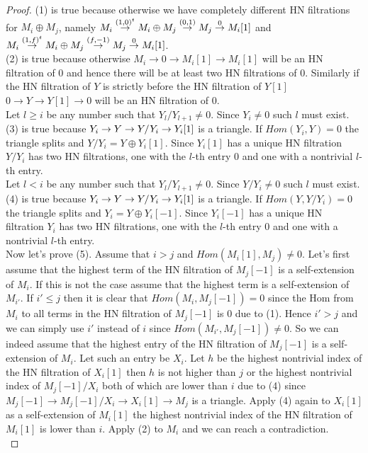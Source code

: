 \begin{proof}
\indent (1) is true because otherwise we have completely different HN filtrations for $M_i\oplus M_j$, namely $M_i\overset{(1,0)^t}{\to} M_i\oplus M_j\overset{(0,1)}{\to} M_j\overset{0}{\to} M_i[1]$ and $M_i\overset{(1,f)^t}{\to} M_i\oplus M_j\overset{(f,-1)}{\to} M_j\overset{0}{\to} M_i[1]$.\\
\indent (2) is true because otherwise $M_i\to 0\to M_i[1]\to M_i[1]$ will be an HN filtration of 0 and hence there will be at least two HN filtrations of 0. Similarly if the HN filtration of $Y$ is strictly before the HN filtration of $Y[1]$ $0\to Y\to Y[1]\to 0$ will be an HN filtration of 0.\\
\indent Let $l \geq i$ be any number such that $Y_l/Y_{l+1}\neq 0$. Since $Y_i\neq 0$ such $l$ must exist. (3) is true because $Y_i\to Y\to Y/Y_i\to Y_i[1]$ is a triangle. If $Hom(Y_i,Y)= 0$ the triangle splits and $Y/Y_i = Y\oplus Y_i[1]$. Since $Y_i[1]$ has a unique HN filtration $Y/Y_i$ has two HN filtrations, one with the $l$-th entry 0 and one with a nontrivial $l$-th entry. \\
\indent Let $l < i$ be any number such that $Y_l/Y_{l+1}\neq 0$. Since $Y/Y_i\neq 0$ such $l$ must exist. (4) is true because $Y_i\to Y\to Y/Y_i\to Y_i[1]$ is a triangle. If $Hom(Y,Y/Y_i)= 0$ the triangle splits and $Y_i = Y\oplus Y_i[-1]$. Since $Y_i[-1]$ has a unique HN filtration $Y_i$ has two HN filtrations, one with the $l$-th entry 0 and one with a nontrivial $l$-th entry. \\
\indent Now let's prove (5). Assume that $i>j$ and $Hom(M_i[1],M_j) \neq 0$. Let's first assume that the highest term of the HN filtration of $M_j[-1]$ is a self-extension of $M_i$. If this is not the case assume that the highest term is a self-extension of $M_{i'}$. If $i'\leq j$ then it is clear that $Hom(M_i,M_j[-1])=0$ since the Hom from $M_i$ to all terms in the HN filtration of $M_j[-1]$ is 0 due to (1). Hence $i'>j$ and we can simply use $i'$ instead of $i$ since $Hom(M_{i'},M_j[-1])\neq 0$. So we can indeed assume that the highest entry of the HN filtration of $M_j[-1]$ is a self-extension of $M_i$. Let such an entry be $X_i$. Let $h$ be the highest nontrivial index of the HN filtration of $X_i[1]$ then $h$ is not higher than $j$ or the highest nontrivial index of $M_j[-1]/X_i$ both of which are lower than $i$ due to (4) since $M_j[-1]\to M_j[-1]/X_i\to X_i[1]\to M_j$ is a triangle. Apply (4) again to $X_i[1]$ as a self-extension of $M_i[1]$ the highest nontrivial index of the HN filtration of $M_i[1]$ is lower than $i$. Apply (2) to $M_i$ and we can reach a contradiction.\\

\end{proof}
